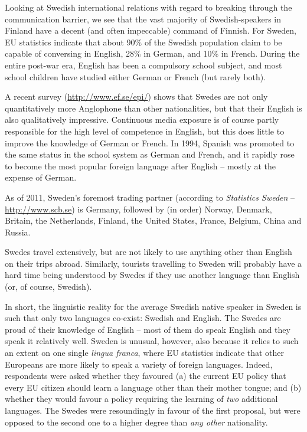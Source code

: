 \begin{multicols}{2}
Looking at Swedish international relations with regard to breaking through the
communication barrier, we see that the vast majority of
Swedish-speakers in Finland have a decent (and often impeccable)
command of Finnish. For Sweden, EU statistics\cite{EC237, EC243} 
indicate that about 90\% of the Swedish population claim
to be capable of conversing in English, 28\% in German, and 10\% in
French. During the entire post-war era, English has been a compulsory
school subject, and most school children have studied either German or
French (but rarely both). 


A recent survey (\url{http://www.ef.se/epi/}) shows that Swedes are not only
quantitatively more Anglophone than other nationalities, but that
their English is also qualitatively impressive. Continuous media
exposure is of course partly responsible for the high level of
competence in English, but this does little to improve the knowledge
of German or French. In 1994, Spanish was promoted to the same status
in the school system as German and French, and it rapidly rose to
become the most popular foreign language after English -- mostly at the
expense of German.

As of 2011, Sweden's foremost trading partner (according to
\textit{Statistics Sweden} -- \url{http://www.scb.se}) is Germany,
followed by (in order) Norway, Denmark, Britain, the Netherlands,
Finland, the United States, France, Belgium, China and Russia.

Swedes travel extensively, but are not likely to use anything other
than English on their trips abroad.  Similarly, tourists travelling to
Sweden will probably have a hard time being understood by Swedes if
they use another language than English (or, of course, Swedish).

In short, the linguistic reality for the average Swedish native
speaker in Sweden is such that only two languages co-exist: Swedish
and English. The Swedes are proud of their knowledge of English -- most
of them do speak English and they speak it relatively well. Sweden is
unusual, however, also because it relies to such an extent on one
single \textit{lingua franca}, where EU
statistics\cite{EC243} indicate that other Europeans
are more likely to speak a variety of foreign languages. Indeed,
respondents were asked whether they favoured (a) the current EU policy
that every EU citizen should learn a language other than their mother
tongue; and (b) whether they would favour a policy requiring the
learning of \textit{two} additional languages. The Swedes were
resoundingly in favour of the first proposal, but were opposed to the
second one to a higher degree than \textit{any other} nationality.


\end{multicols}
